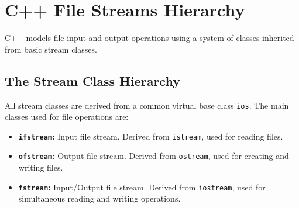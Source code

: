 \documentclass[12pt,a4paper]{article}
\begin{document}
\section{C++ File Streams Hierarchy}

C++ models file input and output operations using a system of classes inherited from basic stream classes.

\subsection{The Stream Class Hierarchy}
All stream classes are derived from a common virtual base class \texttt{ios}. The main classes used for file operations are:
\begin{itemize}[leftmargin=*, itemsep=3.5pt]
  \item \textbf{\texttt{ifstream}:} Input file stream. Derived from \texttt{istream}, used for reading files.
  \item \textbf{\texttt{ofstream}:} Output file stream. Derived from \texttt{ostream}, used for creating and writing files.
  \item \textbf{\texttt{fstream}:} Input/Output file stream. Derived from \texttt{iostream}, used for simultaneous reading and writing operations.
\end{itemize}
\end{document}
